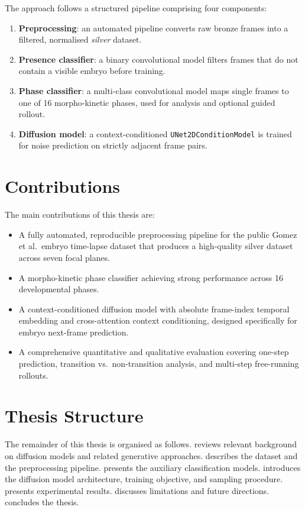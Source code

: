 \documentclass[12pt, a4paper, twoside]{report}
\begin{document}
The approach follows a structured pipeline comprising four components:
\begin{enumerate}
  \item \textbf{Preprocessing}: an automated pipeline converts raw bronze
        frames into a filtered, normalised \emph{silver} dataset.
  \item \textbf{Presence classifier}: a binary convolutional model filters
        frames that do not contain a visible embryo before training.
  \item \textbf{Phase classifier}: a multi-class convolutional model maps
        single frames to one of 16 morpho-kinetic phases, used for analysis
        and optional guided rollout.
  \item \textbf{Diffusion model}: a context-conditioned
        \texttt{UNet2DConditionModel} is trained for noise prediction on
        strictly adjacent frame pairs.
\end{enumerate}

\section{Contributions}
\label{sec:contributions}

The main contributions of this thesis are:
\begin{itemize}
  \item A fully automated, reproducible preprocessing pipeline for the public
        Gomez et al.\ embryo time-lapse dataset that produces a high-quality
        silver dataset across seven focal planes.
  \item A morpho-kinetic phase classifier achieving strong performance across
        16 developmental phases.
  \item A context-conditioned diffusion model with absolute frame-index
        temporal embedding and cross-attention context conditioning, designed
        specifically for embryo next-frame prediction.
  \item A comprehensive quantitative and qualitative evaluation covering
        one-step prediction, transition vs.\ non-transition analysis, and
        multi-step free-running rollouts.
\end{itemize}

\section{Thesis Structure}
\label{sec:structure}

The remainder of this thesis is organised as follows.
 reviews relevant background on diffusion models and
related generative approaches.
 describes the dataset and the preprocessing pipeline.
 presents the auxiliary classification models.
 introduces the diffusion model architecture, training
objective, and sampling procedure.
 presents experimental results.
 discusses limitations and future directions.
 concludes the thesis.
\end{document}
